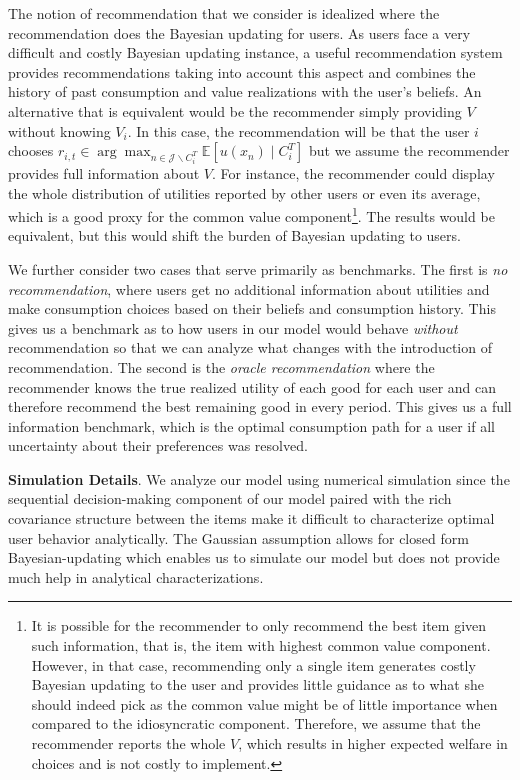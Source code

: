 \documentclass[sigconf, anonymous, review]{acmart}
\begin{document}
The notion of recommendation that we consider is idealized where the recommendation does the Bayesian updating for users. As users face a very difficult and costly Bayesian updating instance, a useful recommendation system provides recommendations taking into account this aspect and combines the history of past consumption and value realizations with the user's beliefs. 
An alternative that is equivalent would be the recommender simply providing $V$ without knowing $V_i$. In this case, the recommendation will be that the user $i$ chooses $r_{i,t} \in \arg \max_{n\in \mathcal J\backslash C^T_i} \mathbb E[u(x_n) \mid C_i^T]$
but we assume the recommender provides full information about $V$. For instance, the recommender could display the whole distribution of utilities reported by other users or even its average, which is a good proxy for the common value component\footnote{It is possible for the recommender to only recommend the best item given such information, that is, the item with highest common value component. However, in that case, recommending only a single item generates costly Bayesian updating to the user and provides little guidance as to what she should indeed pick as the common value might be of little importance when compared to the idiosyncratic component. Therefore, we assume that the recommender reports the whole $V$, which results in higher expected welfare in choices and is not costly to implement.}.
The results would be equivalent, but this would shift the burden of Bayesian updating to users.
\par

We further consider two cases that serve primarily as benchmarks. The first is \textit{no recommendation}, where users get no additional information about utilities and make consumption choices based on their beliefs and consumption history. This gives us a benchmark as to how users in our model would behave \textit{without} recommendation so that we can analyze what changes with the introduction of recommendation. The second is the \textit{oracle recommendation} where the recommender knows the true realized utility of each good for each user and can therefore recommend the best remaining good in every period. This gives us a full information benchmark, which is the optimal consumption path for a user if all uncertainty about their preferences was resolved.
\par

\noindent \textbf{Simulation Details}. 
We analyze our model using numerical simulation since the sequential decision-making component of our model paired with the rich covariance structure between the items make it difficult to characterize optimal user behavior analytically. The Gaussian assumption allows for closed form Bayesian-updating which enables us to simulate our model but does not provide much help in analytical characterizations. 
\par
\end{document}
